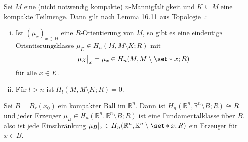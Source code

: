 \begin{erinnerungA}[{name=[Orientierungsklassen für kompakte Teilmengen]},label=errinnerung:Orientierung_kompakteTM]
	Sei $M$ eine (nicht notwendig kompakte) $n$-Mannigfaltigkeit und $K \subseteq M$ eine kompakte Teilmenge. Dann gilt nach Lemma 16.11 aus Topologie .:
	\begin{enumerate}[(i),itemsep=0pt]
		\item Ist $(\mu_x)_{x \in M}$ eine $R$-Orientierung von $M$, so gibt es eine eindeutige Orientierungsklasse $\mu_K \in H_n(M,M \setminus K;R)$ mit 
		\[
			\mu_K\big|_x = \mu_x \in H_n(M,M \setminus \set*{x};R)
		\]
		für alle $x \in K$.
		\item Für $l>n$ ist $H_l(M, M \setminus K;R)=0$.
	\end{enumerate}
\end{erinnerungA}

\begin{beispiel}[{name=[Fundamentalklasse eines kompakten Balls]}]
	Sei $B=B_r(x_0)$ ein kompakter Ball im $\mathbb{R}^n$. 
	Dann ist $H_n(\mathbb{R}^n,\mathbb{R}^n \setminus B;R) \cong R$ und jeder Erzeuger $\mu_B \in H_n(\mathbb{R}^n,\mathbb{R}^n \setminus B;R)$ ist eine Fundamentalklasse über $B$, also ist jede Einschränkung $\mu_B|_x \in H_n(\mathbb{R}^n,\mathbb{R}^n \setminus \set*{x};R)$ ein Erzeuger für $x \in B$.
\end{beispiel}

